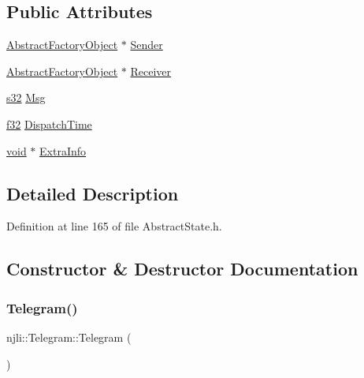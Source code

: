\subsection*{Public Attributes}
\begin{DoxyCompactItemize}
\item 
\mbox{\hyperlink{classnjli_1_1_abstract_factory_object}{Abstract\+Factory\+Object}} $\ast$ \mbox{\hyperlink{classnjli_1_1_telegram_ac8d9684f9beb98cdbfb912cefb18f036}{Sender}}
\item 
\mbox{\hyperlink{classnjli_1_1_abstract_factory_object}{Abstract\+Factory\+Object}} $\ast$ \mbox{\hyperlink{classnjli_1_1_telegram_aa2811ae30fb5bcbdb6dfd89bd1305b52}{Receiver}}
\item 
\mbox{\hyperlink{_util_8h_aa62c75d314a0d1f37f79c4b73b2292e2}{s32}} \mbox{\hyperlink{classnjli_1_1_telegram_a5b15d94b15ff8de3637c94f93744b26c}{Msg}}
\item 
\mbox{\hyperlink{_util_8h_a5f6906312a689f27d70e9d086649d3fd}{f32}} \mbox{\hyperlink{classnjli_1_1_telegram_ad3624ff53bc492416a0b19f39107bfeb}{Dispatch\+Time}}
\item 
\mbox{\hyperlink{_thread_8h_af1e856da2e658414cb2456cb6f7ebc66}{void}} $\ast$ \mbox{\hyperlink{classnjli_1_1_telegram_a2248c08d1f6bd31106010ec55c7c0818}{Extra\+Info}}
\end{DoxyCompactItemize}


\subsection{Detailed Description}


Definition at line 165 of file Abstract\+State.\+h.



\subsection{Constructor \& Destructor Documentation}
\mbox{\label{classnjli_1_1_telegram_aa11c66843172eabb2329c15a4d7ebe05}} 
\subsubsection{\texorpdfstring{Telegram()}{Telegram()}\hspace{0.1cm}{\footnotesize\ttfamily [1/2]}}
{\footnotesize\ttfamily njli\+::\+Telegram\+::\+Telegram (\begin{DoxyParamCaption}{ }\end{DoxyParamCaption})\hspace{0.3cm}{\ttfamily [inline]}}



